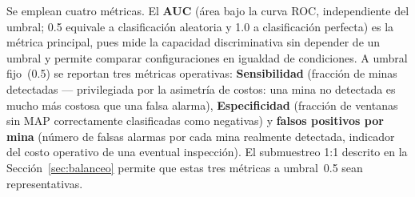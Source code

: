 Se emplean cuatro métricas. El \textbf{AUC} (área bajo la curva \ac{ROC},
independiente del umbral; 0.5 equivale a clasificación aleatoria y 1.0 a
clasificación perfecta) es la métrica principal, pues mide la capacidad
discriminativa sin depender de un umbral y permite comparar configuraciones en
igualdad de condiciones. A umbral fijo~(0.5) se reportan tres métricas operativas:
\textbf{Sensibilidad} (fracción de minas detectadas --- privilegiada por la
asimetría de costos: una mina no detectada es mucho más costosa que una falsa
alarma), \textbf{Especificidad} (fracción de ventanas sin \ac{MAP} correctamente
clasificadas como negativas) y \textbf{falsos positivos por mina} (número de
falsas alarmas por cada mina realmente detectada, indicador del costo operativo de
una eventual inspección). El submuestreo 1:1 descrito en la
Sección~\ref{sec:balanceo} permite que estas tres métricas a umbral~0.5 sean
representativas.


